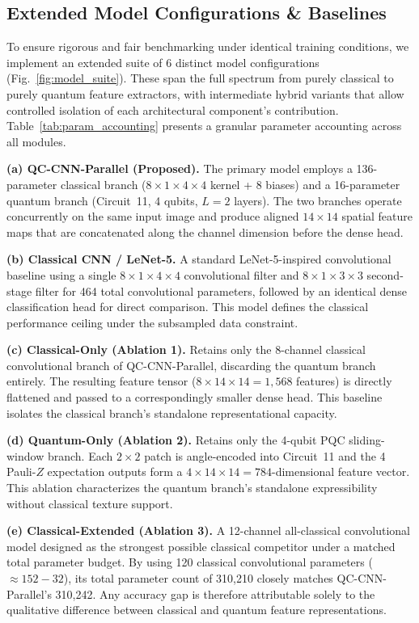 \documentclass[journal]{IEEEtran}
\begin{document}
\subsection{Extended Model Configurations \& Baselines}
To ensure rigorous and fair benchmarking under identical training conditions, we implement an extended suite of 6 distinct model configurations (Fig.~\ref{fig:model_suite}). These span the full spectrum from purely classical to purely quantum feature extractors, with intermediate hybrid variants that allow controlled isolation of each architectural component's contribution. Table~\ref{tab:param_accounting} presents a granular parameter accounting across all modules.

\textbf{(a) QC-CNN-Parallel (Proposed).} The primary model employs a 136-parameter classical branch ($8 \times 1 \times 4 \times 4$ kernel + 8 biases) and a 16-parameter quantum branch (Circuit~11, 4 qubits, $L=2$ layers). The two branches operate concurrently on the same input image and produce aligned $14 \times 14$ spatial feature maps that are concatenated along the channel dimension before the dense head.

\textbf{(b) Classical CNN / LeNet-5.} A standard LeNet-5-inspired convolutional baseline \cite{huang2021experimental} using a single $8 \times 1 \times 4 \times 4$ convolutional filter and $8 \times 1 \times 3 \times 3$ second-stage filter for 464 total convolutional parameters, followed by an identical dense classification head for direct comparison. This model defines the classical performance ceiling under the subsampled data constraint.

\textbf{(c) Classical-Only (Ablation 1).} Retains only the 8-channel classical convolutional branch of QC-CNN-Parallel, discarding the quantum branch entirely. The resulting feature tensor ($8 \times 14 \times 14 = 1,568$ features) is directly flattened and passed to a correspondingly smaller dense head. This baseline isolates the classical branch's standalone representational capacity.

\textbf{(d) Quantum-Only (Ablation 2).} Retains only the 4-qubit PQC sliding-window branch. Each $2 \times 2$ patch is angle-encoded into Circuit~11 and the 4 Pauli-$Z$ expectation outputs form a $4 \times 14 \times 14 = 784$-dimensional feature vector. This ablation characterizes the quantum branch's standalone expressibility without classical texture support.

\textbf{(e) Classical-Extended (Ablation 3).} A 12-channel all-classical convolutional model designed as the strongest possible classical competitor under a matched total parameter budget. By using 120 classical convolutional parameters ($\approx 152 - 32$), its total parameter count of 310,210 closely matches QC-CNN-Parallel's 310,242. Any accuracy gap is therefore attributable solely to the qualitative difference between classical and quantum feature representations.
\end{document}
